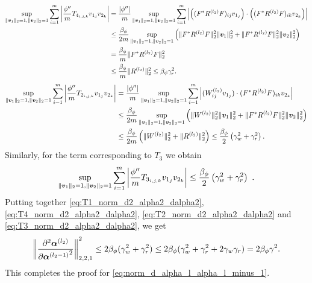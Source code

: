     \begin{align}
    \label{eq:T4_norm_d2_alpha2_dalpha2}
        \begin{aligned}
            \sup_{\|{\bm{v}}_1\|_2 = 1,\|{\bm{v}}_2\|_2 = 1} \sum_{i=1}^m\left| \frac{\phi''}{m}T_{4_{i,j,k}}v_{1_j}v_{2_k} \right|
            &= \frac{|\phi''|}{m} \sup_{\|{\bm{v}}_1\|_2 = 1,\|{\bm{v}}_2\|_2 = 1} \sum_{i=1}^m
            \left| 
            \left((F^*R^{(l_2)}F)_{ij}v_{1_j} \right)\cdot \left((F^*R^{(l_2)}F)_{ik}v_{2_k} \right)
            \right|\\
            &\leq \frac{\beta_{\phi}}{2m} \sup_{\|{\bm{v}}_1\|_2 = 1,\|{\bm{v}}_2\|_2 = 1} \left( 
                \|F^*R^{(l_2)}F\|_2^2 \|{\bm{v}}_1\|_2^2 + \|F^*R^{(l_2)}F\|_2^2 \|{\bm{v}}_2\|_2^2
            \right)\\
            &=\frac{\beta_{\phi}}{m} \| F^*R^{(l_2)}F\|_2^2\\
            &\leq \frac{\beta_{\phi}}{m}\|R^{(l_2)}\|_2^2 \leq \beta_{\phi}\gamma^2_r.
        \end{aligned}
    \end{align}
    \begin{align}
    \label{eq:T2_norm_d2_alpha2_dalpha2}
        \begin{aligned}
            \sup_{\|{\bm{v}}_1\|_2 = 1,\|{\bm{v}}_2\|_2 = 1} \sum_{i=1}^m \left|\frac{\phi''}{m}T_{2_{i,j,k}}v_{1_j}v_{2_k}\right|
            &= \frac{|\phi''|}{m} \sup_{\|{\bm{v}}_1\|_2 = 1,\|{\bm{v}}_2\|_2 = 1} \sum_{i=1}^m
            \left|
                (W^{(l_2)}_{ij}v_{1_j})\cdot (F^*R^{(l_2)}F)_{ik}v_{2_k}
            \right|\\
            &\leq \frac{\beta_{\phi}}{2m} \sup_{\|{\bm{v}}_1\|_2 = 1,\|{\bm{v}}_2\|_2 = 1}
            \left( \| W^{(l_2)}\|_2^2 \| {\bm{v}}_1\|_2^2 + \| F^*R^{(l_2)}F\|_2^2 \| {\bm{v}}_2\|_2^2 \right)\\
            &\leq\frac{\beta_{\phi}}{2m}\left( \|W^{(l_2)}\|_2^2 + \|R^{(l_2)}\|_2^2\right) \leq \frac{\beta_{\phi}}{2} \left( \gamma_w^2 + \gamma_r^2\right).
        \end{aligned}
    \end{align}
    Similarly, for the term corresponding to $T_3$ we obtain
    \begin{align}
    \label{eq:T3_norm_d2_alpha2_dalpha2}
        \begin{aligned}
            \sup_{\|{\bm{v}}_1\|_2 = 1,\|{\bm{v}}_2\|_2 = 1} \sum_{i=1}^m \left|\frac{\phi''}{m}T_{3_{i,j,k}}v_{1_j}v_{2_k}\right| \leq \frac{\beta_{\phi}}{2} \left( \gamma_w^2 + \gamma_r^2\right)~.
        \end{aligned}
    \end{align}
    Putting together \eqref{eq:T1_norm_d2_alpha2_dalpha2}, \eqref{eq:T4_norm_d2_alpha2_dalpha2}, \eqref{eq:T2_norm_d2_alpha2_dalpha2} and \eqref{eq:T3_norm_d2_alpha2_dalpha2}, we get
    \begin{align}
        \left\| {\frac{\partial^2 \boldsymbol{\alpha}^{(l_2)}}{\partial {\boldsymbol{\alpha}^{(l_2-1)}}^2}}\right\|_{2,2,1}^2 \leq 2 \beta_{\phi} (\gamma_w^2 + \gamma_r^2) \leq 2\beta_\phi (\gamma_w^2 + \gamma_r^2 + 2\gamma_w\gamma_r) = 2\beta_\phi\gamma^2.
    \end{align}
    This completes the proof for \eqref{eq:norm_d_alpha_l_alpha_l_minus_1}. 
    
